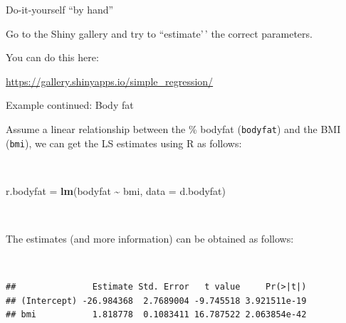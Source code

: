 \documentclass[
  10pt,
  ignorenonframetext,
]{beamer}
\newenvironment{Shaded}{\begin{snugshade}}{\end{snugshade}}
\newcommand{\AttributeTok}[1]{\textcolor[rgb]{0.13,0.29,0.53}{#1}}
\newcommand{\FunctionTok}[1]{\textcolor[rgb]{0.13,0.29,0.53}{\textbf{#1}}}
\newcommand{\NormalTok}[1]{#1}
\newcommand{\OtherTok}[1]{\textcolor[rgb]{0.56,0.35,0.01}{#1}}
\newcommand{\SpecialCharTok}[1]{\textcolor[rgb]{0.81,0.36,0.00}{\textbf{#1}}}
\begin{document}
\begin{frame}
\begin{block}{Do-it-yourself ``by hand''}
\protect\hypertarget{do-it-yourself-by-hand}{}
\vspace{6mm}

Go to the Shiny gallery and try to ``estimate'\,' the correct
parameters. \vspace{2mm}

You can do this here: \vspace{2mm}

\url{https://gallery.shinyapps.io/simple_regression/}
\end{block}
\end{frame}

\begin{frame}[fragile]
\begin{block}{Example continued: Body fat}
\protect\hypertarget{example-continued-body-fat}{}
\vspace{2mm}

Assume a linear relationship between the \% bodyfat (\texttt{bodyfat})
and the BMI (\texttt{bmi}), we can get the LS estimates using R as
follows:

\(~\)

\scriptsize

\begin{Shaded}
\begin{Highlighting}[]
\NormalTok{r.bodyfat }\OtherTok{=} \FunctionTok{lm}\NormalTok{(bodyfat }\SpecialCharTok{\textasciitilde{}}\NormalTok{ bmi, }\AttributeTok{data =}\NormalTok{ d.bodyfat)}
\end{Highlighting}
\end{Shaded}

\(~\)

\normalsize

The estimates (and more information) can be obtained as follows:

\(~\)

\scriptsize

\begin{Shaded}
\end{Shaded}

\begin{verbatim}
##               Estimate Std. Error   t value     Pr(>|t|)
## (Intercept) -26.984368  2.7689004 -9.745518 3.921511e-19
## bmi           1.818778  0.1083411 16.787522 2.063854e-42
\end{verbatim}
\end{block}
\end{frame}
\end{document}
